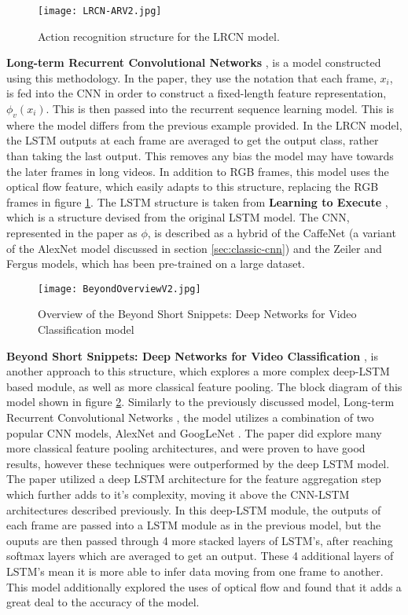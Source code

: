 \begin{figure}[ht]
	\texttt{[image: LRCN-ARV2.jpg]}
	\centering
	\caption{Action recognition structure for the LRCN model. \cite{LRCNS}}
	\label{fig:lrcn-ar}
\end{figure}

\textbf{Long-term Recurrent Convolutional Networks} \cite{LRCNS}, is a model constructed using this methodology. In the paper, they use the notation that each frame, $x_{i}$, is fed into the CNN in order to construct a fixed-length feature representation, $\phi_{v}(x_{i})$. This is then passed into the recurrent sequence learning model. This is where the model differs from the previous example provided. In the LRCN model, the LSTM outputs at each frame are averaged to get the output class, rather than taking the last output. This removes any bias the model may have towards the later frames in long videos. In addition to RGB frames, this model uses the optical flow feature, which easily adapts to this structure, replacing the RGB frames in figure \ref{fig:lrcn-ar}. The LSTM structure is taken from \textbf{Learning to Execute} \cite{LSTM-2015}, which is a structure devised from the original LSTM model. The CNN, represented in the paper as $\phi$, is described as a hybrid of the CaffeNet \cite{caffenet} (a variant of the AlexNet \cite{alexnet} model discussed in section \ref{sec:classic-cnn}) and the Zeiler and Fergus \cite{zeilerfergus} models, which has been pre-trained on a large dataset.

\begin{figure}[ht]
	\texttt{[image: BeyondOverviewV2.jpg]}
	\centering
	\caption{Overview of the Beyond Short Snippets: Deep Networks for Video Classification model \cite{beyondshortsnippets}}
	\label{fig:beyondoverview}
\end{figure}

\textbf{Beyond Short Snippets: Deep Networks for Video Classification} \cite{beyondshortsnippets}, is another approach to this structure, which explores a more complex deep-LSTM based module, as well as more classical feature pooling. The block diagram of this model shown in figure \ref{fig:beyondoverview}. Similarly to the previously discussed model, Long-term Recurrent Convolutional Networks \cite{LRCNS}, the model utilizes a combination of two popular CNN models, AlexNet \cite{alexnet} and GoogLeNet \cite{googlenet}. The paper did explore many more classical feature pooling architectures, and were proven to have good results, however these techniques were outperformed by the deep LSTM model. The paper utilized a deep LSTM architecture for the feature aggregation step which further adds to it's complexity, moving it above the CNN-LSTM architectures described previously. In this deep-LSTM module, the outputs of each frame are passed into a LSTM module as in the previous model, but the ouputs are then passed  through 4 more stacked layers of LSTM's, after reaching softmax layers which are averaged to get an output. These 4 additional layers of LSTM's mean it is more able to infer data moving from one frame to another. This model additionally explored the uses of optical flow and found that it adds a great deal to the accuracy of the model.

